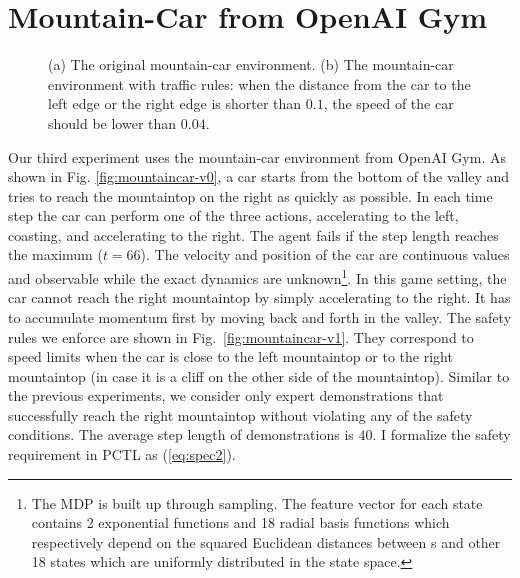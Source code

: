 {\section{Mountain-Car from OpenAI Gym}
\begin{figure}[h]
\centering
{}
\caption{(a) The original mountain-car environment. (b) The mountain-car environment with traffic rules: when the distance from the car to the left edge or the right edge is shorter than $0.1$, the speed of the car should be lower than $0.04$.}  
\label{fig:mountaincar}
\end{figure}

Our third experiment uses the mountain-car environment from OpenAI Gym. As shown in Fig. {\ref{fig:mountaincar-v0}}, a car starts from the bottom of the valley and tries to reach the mountaintop on the right as quickly as possible. In each time step the car can perform one of the three actions, accelerating to the left, coasting, and accelerating to the right. The agent fails if the step length reaches the maximum ($t=66$). The velocity and position of the car are continuous values and observable while the exact dynamics are unknown\footnote{The MDP is built up through sampling. The feature vector for each state contains 2 exponential functions and 18 radial basis functions which respectively depend on the squared Euclidean distances between s and other 18 states which are uniformly distributed in the state space.}. In this game setting, the car cannot reach the right mountaintop by simply accelerating to the right. It has to accumulate momentum first by moving back and forth in the valley. The safety rules we enforce are shown in Fig.~{\ref{fig:mountaincar-v1}}. They correspond to speed limits when the car is close to the left mountaintop or to the right mountaintop (in case it is a cliff on the other side of the mountaintop). Similar to the previous experiments, we consider only expert demonstrations that successfully reach the right mountaintop without violating any of the safety conditions. 
The average step length of demonstrations is $40$. 
 I formalize the safety requirement in PCTL as (\ref{eq:spec2}). 

}
